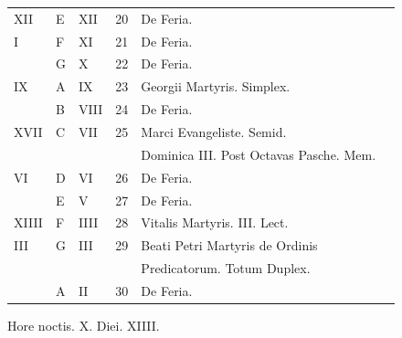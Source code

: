 \begin{center}
\begin{tabular}{l | l | l | r | l l}
\color{Red} XII & E & \color{Red} XII & 20 & De Feria. & \color{Red} \\
\color{Red} I & F & \color{Red} XI & 21 & De Feria. & \color{Red} \\
\color{Red}  & G & \color{Red} X & 22 & De Feria. & \color{Red} \\
\color{Red} IX & \color{Red} A & \color{Red} IX & 23 & Georgii Martyris. Simplex. & \color{Red} \\
\color{Red}  & B & \color{Red} VIII & 24 & De Feria. & \color{Red} \\
\color{Red} XVII & C & \color{Red} VII & 25 & \color{Red} Marci Evangeliste. Semid. \\
 & & & & \quad \color{Red} Dominica III. Post Octavas Pasche. \color{black} Mem. \\
\color{Red} VI & D & \color{Red} VI & 26 & De Feria. & \color{Red} \\
\color{Red}  & E & \color{Red} V & 27 & De Feria. & \color{Red} \\
\color{Red} XIIII & F & \color{Red} IIII & 28 & Vitalis Martyris. III. Lect. & \color{Red} \\
\color{Red} III & G & \color{Red} III & 29 & \multicolumn{2}{l}{Beati Petri Martyris de Ordinis } \\
 & & & & \quad Predicatorum. Totum Duplex. \\
\color{Red}  & \color{Red} A & \color{Red} II & 30 & De Feria. & \color{Red} \\
\end{tabular}
\newline \color{Red} Hore noctis. X. Diei. XIIII.
\end{center}



\newpage
\color{Red}\color{black}

